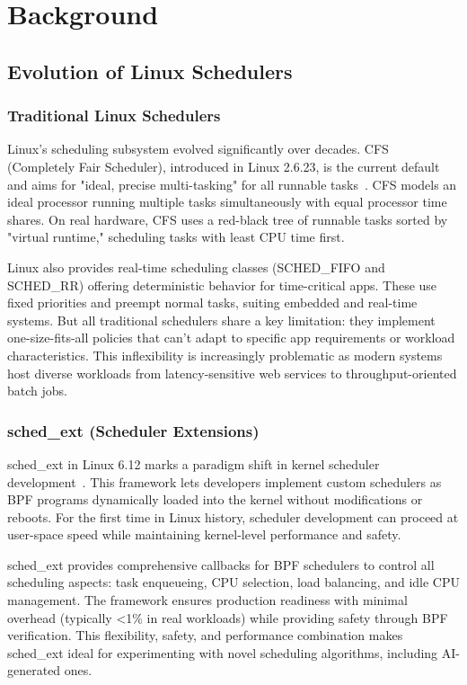 \section{Background}

\subsection{Evolution of Linux Schedulers}

\subsubsection{Traditional Linux Schedulers}

Linux's scheduling subsystem evolved significantly over decades. CFS (Completely Fair Scheduler), introduced in Linux 2.6.23, is the current default and aims for "ideal, precise multi-tasking" for all runnable tasks~\cite{wong2008cfs}. CFS models an ideal processor running multiple tasks simultaneously with equal processor time shares. On real hardware, CFS uses a red-black tree of runnable tasks sorted by "virtual runtime," scheduling tasks with least CPU time first.

Linux also provides real-time scheduling classes (SCHED\_FIFO and SCHED\_RR) offering deterministic behavior for time-critical apps. These use fixed priorities and preempt normal tasks, suiting embedded and real-time systems. But all traditional schedulers share a key limitation: they implement one-size-fits-all policies that can't adapt to specific app requirements or workload characteristics. This inflexibility is increasingly problematic as modern systems host diverse workloads from latency-sensitive web services to throughput-oriented batch jobs.

\subsubsection{sched\_ext (Scheduler Extensions)}

sched\_ext in Linux 6.12 marks a paradigm shift in kernel scheduler development~\cite{schedext2024}. This framework lets developers implement custom schedulers as BPF programs dynamically loaded into the kernel without modifications or reboots. For the first time in Linux history, scheduler development can proceed at user-space speed while maintaining kernel-level performance and safety.

sched\_ext provides comprehensive callbacks for BPF schedulers to control all scheduling aspects: task enqueueing, CPU selection, load balancing, and idle CPU management. The framework ensures production readiness with minimal overhead (typically <1\% in real workloads) while providing safety through BPF verification. This flexibility, safety, and performance combination makes sched\_ext ideal for experimenting with novel scheduling algorithms, including AI-generated ones.


